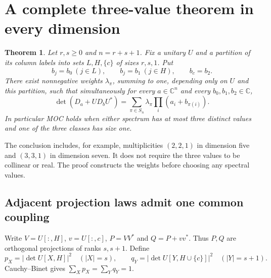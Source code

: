 \documentclass[11pt]{article}
\newtheorem{theorem}{Theorem}[section]\newtheorem{lemma}[theorem]{Lemma}\newtheorem{corollary}[theorem]{Corollary}\newtheorem{proposition}[theorem]{Proposition}
\newcommand{\C}{\mathbb C}\newcommand{\R}{\mathbb R}\newcommand{\conv}{\operatorname{conv}}\newcommand{\diag}{\operatorname{diag}}\newcommand{\tr}{\operatorname{tr}}
\begin{document}
\newpage
\section{A complete three-value theorem in every dimension}

\begin{theorem}\label{three}
Let $r,s\ge0$ and $n=r+s+1$. Fix a unitary $U$ and a partition of its column labels into sets $L,H,\{c\}$ of sizes $r,s,1$. Put
\[
b_j=b_0\ (j\in L),\qquad b_j=b_1\ (j\in H),\qquad b_c=b_2.
\]
There exist nonnegative weights $\lambda_\pi$, summing to one, depending only on $U$ and this partition, such that simultaneously for every $a\in\C^n$ and every $b_0,b_1,b_2\in\C$,
\[
\det(D_a+UD_bU^*)=\sum_{\pi\in S_n}\lambda_\pi\prod_i(a_i+b_{\pi(i)}).
\]
In particular MOC holds when either spectrum has at most three distinct values and one of the three classes has size one.
\end{theorem}

The conclusion includes, for example, multiplicities $(2,2,1)$ in dimension five and $(3,3,1)$ in dimension seven. It does not require the three values to be collinear or real. The proof constructs the weights before choosing any spectral values.

\subsection{Adjacent projection laws admit one common coupling}
Write $V=U[:,H]$, $v=U[:,c]$, $P=VV^*$ and $Q=P+vv^*$. Thus $P,Q$ are orthogonal projections of ranks $s,s+1$. Define
\[
p_X=|\det U[X,H]|^2\quad(|X|=s),\qquad
q_Y=|\det U[Y,H\cup\{c\}]|^2\quad(|Y|=s+1).
\]
Cauchy--Binet gives $\sum_Xp_X=\sum_Yq_Y=1$.
\end{document}
